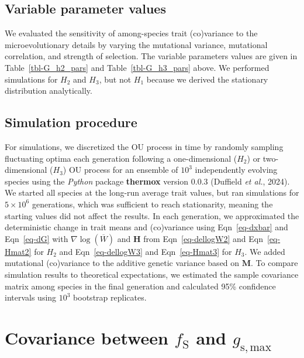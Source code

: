 \documentclass[
  letterpaper,
  DIV=11,
  numbers=noendperiod]{scrartcl}
\begin{document}
\subsection{Variable parameter values}\label{variable-parameter-values}

We evaluated the sensitivity of among-species trait (co)variance to the
microevolutionary details by varying the mutational variance, mutational
correlation, and strength of selection. The variable parameters values
are given in Table~\ref{tbl-G_h2_pars} and Table~\ref{tbl-G_h3_pars}
above. We performed simulations for \(H_2\) and \(H_3\), but not \(H_1\)
because we derived the stationary distribution analytically.

\subsection{Simulation procedure}\label{simulation-procedure}

For simulations, we discretized the OU process in time by randomly
sampling fluctuating optima each generation following a one-dimensional
(\(H_2\)) or two-dimensional (\(H_3\)) OU process for an ensemble of
\(10^3\) independently evolving species using the \emph{Python} package
\textbf{thermox} version 0.0.3 (Duffield \emph{et al.}, 2024). We
started all species at the long-run average trait values, but ran
simulations for \(5 \times 10^6\) generations, which was sufficient to
reach stationarity, meaning the starting values did not affect the
results. In each generation, we approximated the deterministic change in
trait means and (co)variance using Eqn~\ref{eq-dxbar} and
Eqn~\ref{eq-dG} with \(\nabla \log \left( \overline{W} \right)\) and
\(\mathbf{H}\) from Eqn~\ref{eq-dellogW2} and Eqn~\ref{eq-Hmat2} for
\(H_2\) and Eqn~\ref{eq-dellogW3} and Eqn~\ref{eq-Hmat3} for \(H_3\). We
added mutational (co)variance to the additive genetic variance based on
\(\mathbf{M}\). To compare simulation results to theoretical
expectations, we estimated the sample covariance matrix among species in
the final generation and calculated 95\% confidence intervals using
\(10^3\) bootstrap replicates.

\section{\texorpdfstring{Covariance between \(f_\text{S}\) and
\(g_\mathrm{s,max}\)}{Covariance between f\_\textbackslash text\{S\} and g\_\textbackslash mathrm\{s,max\}}}\label{covariance-between-f_texts-and-g_mathrmsmax}
\end{document}

